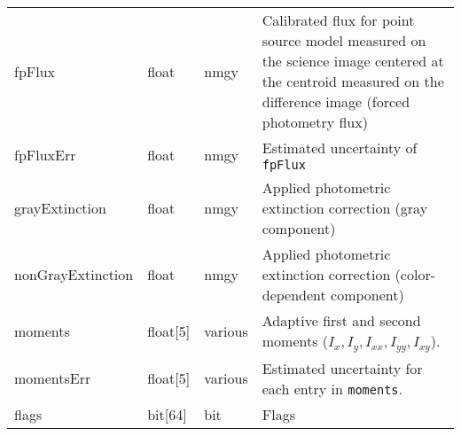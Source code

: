 \documentclass[12pt]{article}
\begin{document}
\begin{center}
\begin{longtable}{p{3cm}p{2cm}p{2cm}p{5cm}}
fpFlux & float & nmgy & Calibrated flux for point source model measured on the science image centered at the centroid measured on the difference image (forced photometry flux) \\ 

fpFluxErr & float & nmgy & Estimated uncertainty of \texttt{fpFlux} \\ 

grayExtinction & float & nmgy & Applied photometric extinction correction (gray component) \\ 

nonGrayExtinction & float & nmgy & Applied photometric extinction correction (color-dependent component) \\ 

moments & float[5] & various & Adaptive first and second moments ($I_{x}, I_{y}, I_{xx}, I_{yy}, I_{xy}$). \\ 

momentsErr & float[5] & various & Estimated uncertainty for each entry in \texttt{moments}. \\ 

flags & bit[64] & bit & Flags \\ \hline
\end{longtable}
\end{center}
\end{document}
